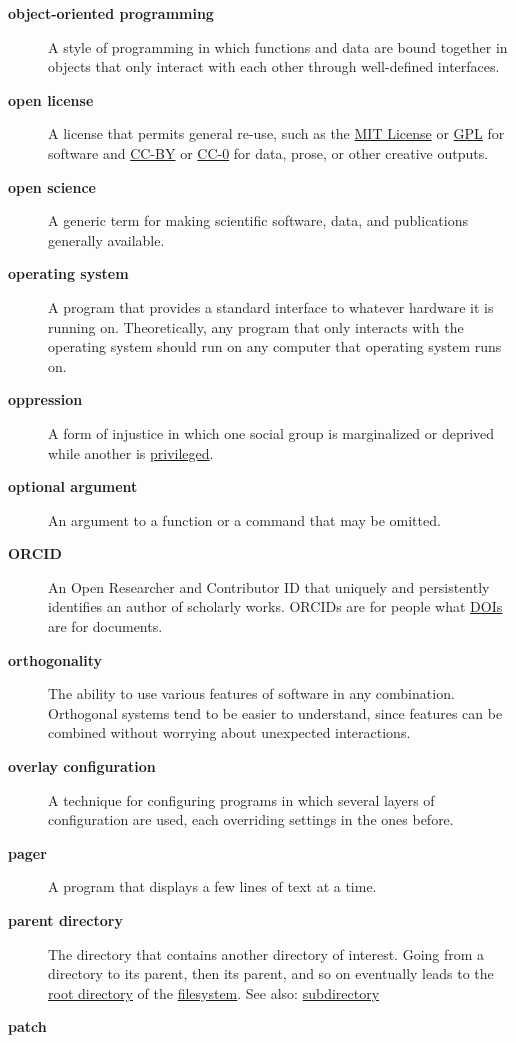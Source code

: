 \documentclass[
]{krantz}
\begin{document}
\begin{description}
\item[\textbf{object-oriented programming}]
A style of programming in which functions and data are bound together in objects that only interact with each other through well-defined interfaces.
\item[\textbf{open license}]
A license that permits general re-use, such as the \protect\hyperlink{mit_license}{MIT License} or \protect\hyperlink{gpl}{GPL} for software and \protect\hyperlink{cc_by}{CC-BY} or \protect\hyperlink{cc_0}{CC-0} for data, prose, or other creative outputs.
\item[\textbf{open science}]
A generic term for making scientific software, data, and publications generally available.
\item[\textbf{operating system}]
A program that provides a standard interface to whatever hardware it is running on. Theoretically, any program that only interacts with the operating system should run on any computer that operating system runs on.
\item[\textbf{oppression}]
A form of injustice in which one social group is marginalized or deprived while another is \protect\hyperlink{privilege}{privileged}.
\item[\textbf{optional argument}]
An argument to a function or a command that may be omitted.
\item[\textbf{ORCID}]
An Open Researcher and Contributor ID that uniquely and persistently identifies an author of scholarly works. ORCIDs are for people what \protect\hyperlink{doi}{DOIs} are for documents.
\item[\textbf{orthogonality}]
The ability to use various features of software in any combination. Orthogonal systems tend to be easier to understand, since features can be combined without worrying about unexpected interactions.
\item[\textbf{overlay configuration}]
A technique for configuring programs in which several layers of configuration are used, each overriding settings in the ones before.
\item[\textbf{pager}]
A program that displays a few lines of text at a time.
\item[\textbf{parent directory}]
The directory that contains another directory of interest. Going from a directory to its parent, then its parent, and so on eventually leads to the \protect\hyperlink{root_directory}{root directory} of the \protect\hyperlink{filesystem}{filesystem}. See also: \protect\hyperlink{subdirectory}{subdirectory}
\item[\textbf{patch}]

\end{description}
\end{document}
